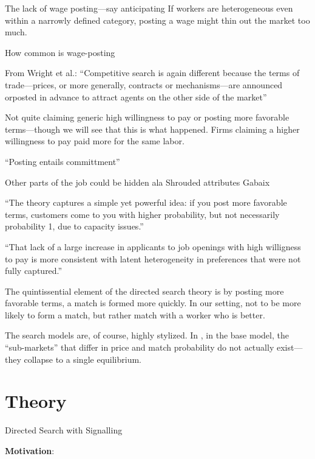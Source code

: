 
The lack of wage posting---say anticipating \cite{horton2019}
If workers are heterogeneous even within a narrowly defined category, posting a wage might thin out the market too much. 
\cite{michelacci2006incomplete}

How common is wage-posting \cite{hall2010evidence}

\cite{banfi2018high}

From Wright et al.: 
``Competitive search is again different because the terms of trade---prices, or more generally, contracts or mechanisms---are announced orposted in advance to attract agents on the other side of the market''

Not quite claiming generic high willingness to pay or posting more favorable terms---though we will see that this is what happened.
Firms claiming a higher willingness to pay paid more for the same labor.



``Posting entails committment''

Other parts of the job could be hidden ala Shrouded attributes Gabaix

``The theory captures a simple yet powerful idea: if you post more favorable terms, customers come to you with higher probability, but not necessarily probability 1, due to capacity issues.''


``That lack of a large increase in applicants to job openings with high willigness to pay is more consistent with latent heterogeneity in preferences that were not fully captured.''

The quintissential element of the directed search theory is by posting more favorable terms, a match is formed more quickly.
In our setting, not to be more likely to form a match, but rather match with a worker who is better.


The search models are, of course, highly stylized.
In \citep{wright2017directed}, in the base model, the ``sub-markets'' that differ in price and match probability do not actually exist---they collapse to a single equilibrium.

\section{Theory}

Directed Search with Signalling

\bigskip

\textbf{Motivation}:

